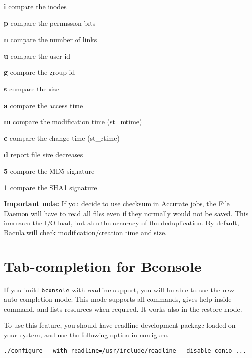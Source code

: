 \begin{description}  
\item {\bf i}
  compare the inodes  
  
\item {\bf p}
  compare the permission bits  
  
\item {\bf n}
  compare the number of links  
  
\item {\bf u}
  compare the user id  
  
\item {\bf g}
  compare the group id  
  
\item {\bf s}
  compare the size  
  
\item {\bf a}
  compare the access time  
  
\item {\bf m}
  compare the modification time (st\_mtime)  
  
\item {\bf c}
  compare the change time (st\_ctime)  
  
\item {\bf d}
  report file size decreases  
  
\item {\bf 5}
  compare the MD5 signature  
  
\item {\bf 1}
  compare the SHA1 signature  
\end{description}

\textbf{Important note:} If you decide to use checksum in Accurate jobs,
the File Daemon will have to read all files even if they normally would not
be saved.  This increases the I/O load, but also the accuracy of the
deduplication.  By default, Bacula will check modification/creation time
and size.

\section{Tab-completion for Bconsole}
\label{sec:tabcompletion}

If you build \texttt{bconsole} with readline support, you will be able to use
the new auto-completion mode. This mode supports all commands, gives help
inside command, and lists resources when required. It works also in the restore
mode.

To use this feature, you should have readline development package loaded on
your system, and use the following option in configure.
\begin{verbatim}
./configure --with-readline=/usr/include/readline --disable-conio ...
\end{verbatim}

